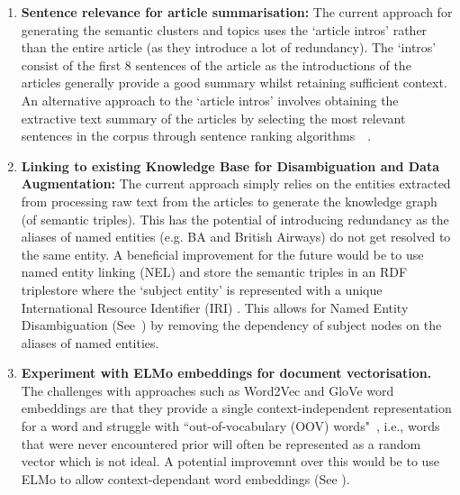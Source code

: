 \begin{enumerate}
    \item \textbf{Sentence relevance for article summarisation:} The current approach for generating the semantic clusters and topics uses the `article intros' rather than the entire article (as they introduce a lot of redundancy). The `intros' consist of the first 8 sentences of the article as the introductions of the articles generally provide a good summary whilst retaining sufficient context. An alternative approach to the `article intros' involves obtaining the extractive text summary of the articles by selecting the most relevant sentences in the corpus through sentence ranking algorithms~\cite{jevzek2008automatic}~\cite{madhuri2019extractive}. 
    
    \item \textbf{Linking to existing Knowledge Base for Disambiguation and Data Augmentation:} The current approach simply relies on the entities extracted from processing raw text from the articles to generate the knowledge graph (of semantic triples). This has the potential of introducing redundancy as the aliases of named entities (e.g. BA and British Airways) do not get resolved to the same entity. A beneficial improvement for the future would be to use named entity linking (NEL)\cite{retrospective_kg} and store the semantic triples in an RDF triplestore where the `subject entity' is represented with a unique International Resource Identifier (IRI) \cite{internationalized}. This allows for Named Entity Disambiguation (See~) by removing the dependency of subject nodes on the aliases of named entities. 
    
    \item \textbf{Experiment with ELMo embeddings for document vectorisation.}  The challenges with approaches such as Word2Vec and GloVe word embeddings are that they provide a single context-independent representation for a word and struggle with ``out-of-vocabulary (OOV) words"~\cite{elmo_word_rep}, i.e., words that were never encountered prior will often be represented as a random vector which is not ideal. A potential improvemnt over this would be to use ELMo to allow context-dependant word embeddings (See ).
    
\end{enumerate}